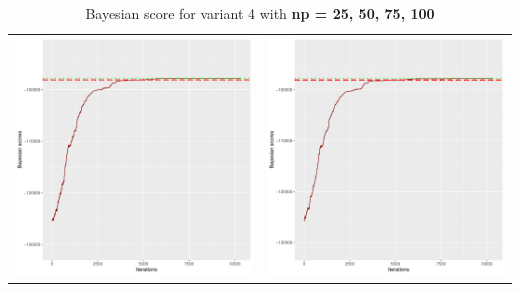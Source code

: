 \documentclass[]{scrartcl}
\begin{document}
\begin{table}[h!]
\begin{tabular}{cc}
\includegraphics[scale = 0.4]{./figs/hepar2/v4/75/bayBoundsEvolution-10352.pdf} & 
\includegraphics[scale = 0.4]{./figs/hepar2/v4/100/bayBoundsEvolution-10352.pdf} \\
\end{tabular}
\caption{Bayesian score for variant 4 with \textbf{np =  25, 50, 75, 100 }}
\end{table}
\end{document}
